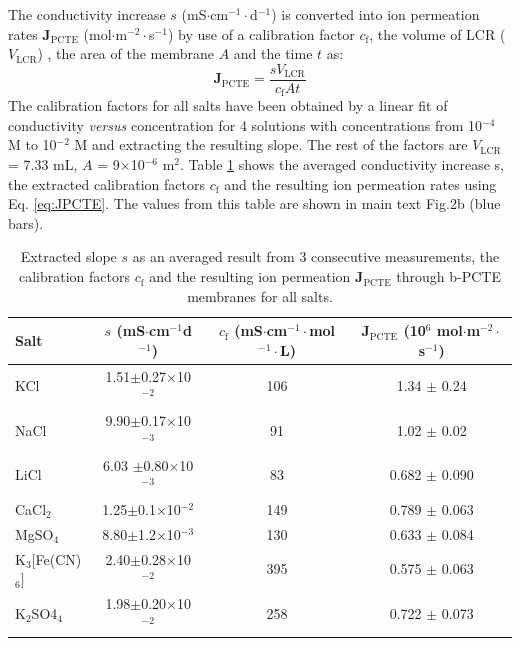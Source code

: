 \documentclass[journal=langd5,email=true, hyperref=true, keywords=false]{achemso}
\newcommand{\Fig}{Fig.}
\begin{document}
The conductivity increase $s$ (mS$\cdot$cm$^{-1}\cdot$d$^{-1}$) is
converted into ion permeation rates $\boldsymbol{J}_{\mathrm{PCTE}}$
(mol$\cdot$m$^{-2}\cdot$s$^{-1}$) by use of a calibration factor
$c_{\mathrm{f}}$, the volume of LCR ($V_{\mathrm{LCR}}$) , the area of
the membrane $A$ and the time $t$ as:
\begin{equation}
  \label{eq:JPCTE}
  \boldsymbol{J}_{\mathrm{PCTE}} = \frac{s V_{\mathrm{LCR}}}{c_{\mathrm{f}} A t}
\end{equation}
The calibration factors for all salts have been obtained by a linear
fit of conductivity \textit{versus} concentration for 4 solutions with
concentrations from 10$^{-4}$ M to 10$^{-2}$ M and extracting the
resulting slope. The rest of the factors are $V_{\mathrm{LCR}}$ = 7.33
mL, $A$ = 9$\times$10$^{-6}$ m$^{2}$. Table \ref{tab:exp-2} shows the
averaged conductivity increase s, the extracted calibration factors
$c_{\mathrm{f}}$ and the resulting ion permeation rates using
Eq. \ref{eq:JPCTE}. The values from this table are shown in main text \Fig 2b
(blue bars).
\begin{table}[htbp]
  \centering
  \begin{tabular}{lccc}
    \hline
    Salt & $s$ (mS$\cdot$cm$^{-1}$d$^{-1}$) & $c_{\mathrm{f}}$ (mS$\cdot$cm$^{-1}\cdot$mol$^{-1}\cdot$L) &
                                                                                                            $\boldsymbol{J}_{\mathrm{PCTE}}$ (10$^{6}$ mol$\cdot$m$^{-2}\cdot$s$^{-1}$)\\
    \hline
    KCl & 1.51$\pm$0.27$\times$10$^{-2}$  & 106   & 1.34 $\pm$ 0.24\\
    NaCl        & 9.90$\pm$0.17$\times$10$^{-3}$ & 91    & 1.02 $\pm$ 0.02\\
    LiCl        & 6.03 $\pm$0.80$\times$10$^{-3}$        & 83    & 0.682 $\pm$ 0.090\\
    CaCl$_{2}$  & 1.25$\pm$0.1$\times$10$^{-2}$    & 149   & 0.789 $\pm$ 0.063\\
    MgSO$_{4}$  & 8.80$\pm$1.2$\times$10$^{-3}$   & 130   & 0.633 $\pm$ 0.084\\
    K$_{3}$[Fe(CN)$_{6}]$ & 2.40$\pm$0.28$\times$10$^{-2}$   & 395   & 0.575 $\pm$ 0.063\\
    K$_{2}$SO4$_{4}$    & 1.98$\pm$0.20$\times$10$^{-2}$  & 258   & 0.722 $\pm$ 0.073\\
    \hline
  \end{tabular}
  \caption{Extracted slope $s$ as an averaged result from 3 consecutive
    measurements, the calibration factors $c_{\mathrm{f}}$ and the resulting ion
    permeation $\boldsymbol{J}_{\mathrm{PCTE}}$ through b-PCTE membranes for all salts.}
  \label{tab:exp-2}
\end{table}
\end{document}
